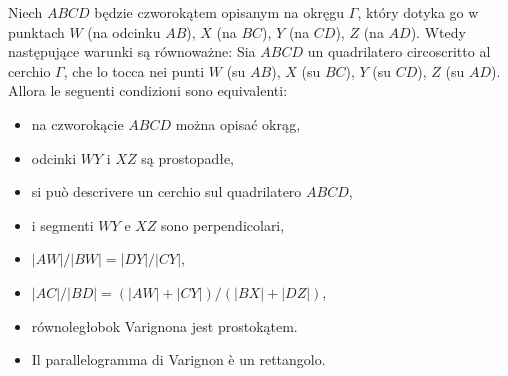 \begin{proposition}
    Niech $ABCD$ będzie czworokątem opisanym na okręgu $\Gamma$, który dotyka go w punktach $W$ (na odcinku $AB$), $X$ (na $BC$), $Y$ (na $CD$), $Z$ (na $AD$). %
    Wtedy następujące warunki są równoważne: %
    Sia $ABCD$ un quadrilatero circoscritto al cerchio $\Gamma$, che lo tocca nei punti $W$ (su $AB$), $X$ (su $BC$), $Y$ (su $CD$), $Z$ (su $AD$). %
    Allora le seguenti condizioni sono equivalenti: %
    \begin{itemize}
        \item na czworokącie $ABCD$ można opisać okrąg, %
        \item odcinki $WY$ i $XZ$ są prostopadłe, %
        \item si può descrivere un cerchio sul quadrilatero $ABCD$, %
        \item i segmenti $WY$ e $XZ$ sono perpendicolari, %
        \item $|AW|/|BW| = |DY|/|CY|$,
        \item $|AC|/|BD| = (|AW| + |CY|) / (|BX| + |DZ|)$,
        \item równoległobok Varignona jest prostokątem.%
        \item Il parallelogramma di Varignon è un rettangolo.%
    \end{itemize}
\end{proposition}


